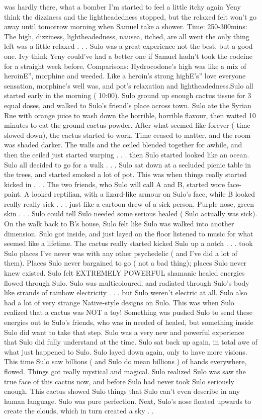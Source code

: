 \documentclass[12pt]{book}
\begin{document}
was hardly there, what a bomber I'm started to feel a little itchy again Yeny think the dizziness and the lightheadedness stopped, but the relaxed felt won't go away until tomorrow morning when Samuel take a shower. Time: 250-300mins: The high, dizziness, lightheadedness, nausea, itched, are all went the only thing left was a little relaxed . . .  Sulo was a great experience not the best, but a good one. Ivy think Yeny could've had a better one if Samuel hadn't took the codeine for a straight week before. Comparisons: Hydrocodone's high was like a mix of heroinE'', morphine and weeded. Like a heroin's strong highE's'' love everyone sensation, morphine's well was, and pot's relaxation and lightheadedness.Sulo all started early in the morning ( 10:00). Sulo ground up enough cactus tissue for 3 equal doses, and walked to Sulo's friend's place across town. Sulo ate the Syrian Rue with orange juice to wash down the horrible, horrible flavour, then waited 10 minutes to eat the ground cactus powder. After what seemed like forever ( time slowed down), the cactus started to work. Time ceased to matter, and the room was shaded darker. The walls and the ceiled blended together for awhile, and then the ceiled just started warping . . .  then Sulo started looked like an ocean. Sulo all decided to go for a walk . . .  Sulo sat down at a secluded picnic table in the trees, and started smoked a lot of pot. This was when things really started kicked in . . .  The two friends, who Sulo will call A and B, started wore face-paint. A looked reptilian, with a lizard-like armour on Sulo's face, while B looked really really sick . . .  just like a cartoon drew of a sick person. Purple nose, green skin . . .  Sulo could tell Sulo needed some serious healed ( Sulo actually was sick). On the walk back to B's house, Sulo felt like Sulo was walked into another dimension. Sulo got inside, and just layed on the floor listened to music for what seemed like a lifetime. The cactus really started kicked Sulo up a notch . . .  took Sulo places I've never was with any other psychedelic ( and I've did a lot of them). Places Sulo never bargained to go ( not a bad thing); places Sulo never knew existed. Sulo felt EXTREMELY POWERFUL shamanic healed energies flowed through Sulo. Sulo was multicoloured, and radiated through Sulo's body like strands of rainbow electricity . . .  but Sulo weren't electric at all. Sulo also had a lot of very strange Native-style designs on Sulo. This was when Sulo realized that a cactus was NOT a toy! Something was pushed Sulo to send these energies out to Sulo's friends, who was in needed of healed, but something inside Sulo did want to take that step. Sulo was a very new and powerful experience that Sulo did fully understand at the time. Sulo sat back up again, in total awe of what just happened to Sulo. Sulo layed down again, only to have more visions. This time Sulo saw billions ( and Sulo do mean billions ) of hands everywhere, flowed. Things got really mystical and magical. Sulo realized Sulo was saw the true face of this cactus now, and before Sulo had never took Sulo seriously enough. This cactus showed Sulo things that Sulo can't even describe in any human language. Sulo was pure perfection. Next, Sulo's nose floated upwards to create the clouds, which in turn created a sky . . 
\end{document}
